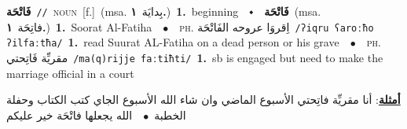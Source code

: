 \documentclass[10pt,a4paper,twoside]{article} %
\begin{document}
\begin{multicols}{2}
{\setlength\topsep{0pt}\textbf{\foreignlanguage{arabic}{فَاتْحَة}}\ {\color{gray}\texttt{//}\color{black}}\ \textsc{noun}\ [f.]\ \color{gray}(msa. \foreignlanguage{arabic}{بِدايَة}~\foreignlanguage{arabic}{\textbf{١.}})\color{black}\ \textbf{1.}~beginning\ \ $\smblkdiamond$\ \ \setlength\topsep{0pt}\textbf{\foreignlanguage{arabic}{فَاتْحَة}}\ \color{gray}(msa. \foreignlanguage{arabic}{فاتِحَة}~\foreignlanguage{arabic}{\textbf{١.}})\color{black}\ \textbf{1.}~Soorat Al-Fatiha\ \ $\bullet$\ \ \textsc{ph.} \color{gray} \foreignlanguage{arabic}{اِقروَا عروحه الفَاتْحَة}\color{black}\ {\color{gray}\texttt{/{\sffamily ʔiqru ʕaroːħo ʔilfaːtħa}/}\color{black}}\ \textbf{1.}~read Suurat AL-Fatiha on a dead person or his grave\ \ $\bullet$\ \ \textsc{ph.} \color{gray} \foreignlanguage{arabic}{مقريِّة فَاتِحتي}\color{black}\ {\color{gray}\texttt{/{\sffamily ma(q)rijje faːtiħti}/}\color{black}}\ \textbf{1.}~sb is engaged but need to make the marriage official in a court\  \begin{flushright}\color{gray}\foreignlanguage{arabic}{\textbf{\underline{\foreignlanguage{arabic}{أمثلة}}}: أنا مقريِّة فاتِحتي الأسبوع الماضي وان شاء الله الأسبوع الجاي كتب الكتاب وحفلة الخطبة\ $\bullet$\ \  الله يجعلها فاتْحَة خير عليكم}\end{flushright}\color{black}} \vspace{2mm}


\end{multicols}
\end{document}
